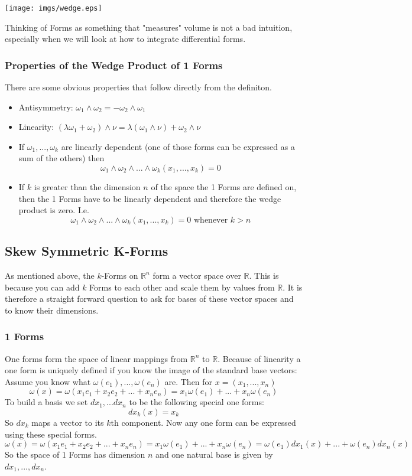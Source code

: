\texttt{[image: imgs/wedge.eps]}

Thinking of Forms as something that "measures" volume is not a bad intuition, especially when we will look at how to integrate differential forms.

\subsubsection*{\textbf{Properties of the Wedge Product of 1 Forms}}

There are some obvious properties that follow directly from the definiton.
\begin{itemize}
\item Antisymmetry: $\omega_1 \wedge \omega_2 = -\omega_2 \wedge \omega_1$
\item Linearity: $(\lambda \omega_1 + \omega_2) \wedge \nu = \lambda (\omega_1 \wedge \nu) + \omega_2 \wedge \nu  $
\item If $\omega_1,...,\omega_k$ are linearly dependent (one of those forms can be expressed as a sum of the others) then
\[\omega_1 \wedge \omega_2\wedge...\wedge \omega_k (x_1,...,x_k) =0\]
\item If $k$ is greater than the dimension $n$ of the space the 1 Forms are defined on, then the 1 Forms have to be linearly dependent and therefore the wedge product is zero. I.e.
\[\omega_1 \wedge \omega_2\wedge...\wedge \omega_k (x_1,...,x_k) =0 \text{ whenever } k>n\]
\end{itemize}
\subsection{Skew Symmetric K-Forms}
As mentioned above, the $k$-Forms on $\mathbb R^n$ form a vector space over $\mathbb R$. This is because you can add $k$ Forms to each other and scale them by values from $\mathbb R$.
It is therefore a straight forward question to ask for bases of these vector spaces and to know their dimensions.
\subsubsection*{\textbf{1 Forms}}
One forms form the space of linear mappings from $\mathbb R^n$ to $\mathbb R$. Because of linearity a one form is uniquely defined if you know the image of the standard base vectors: Assume you know what $\omega(e_1),...,\omega(e_n)$ are. Then for $x=(x_1,...,x_n)$ 
\[\omega(x) = \omega(x_1e_1 + x_2e_2+...+x_ne_n) = x_1\omega(e_1) + ... + x_n\omega(e_n)\]
To build a basis we set $dx_1,...dx_n$ to be the following special one forms:
\[dx_k(x) = x_k\]
So $dx_k$ maps a vector to its $k$th component. Now any one form can be expressed using these special forms.
\[\omega(x) = \omega(x_1e_1 + x_2e_2+...+x_ne_n) = x_1\omega(e_1) + ... + x_n\omega(e_n) = \omega(e_1)dx_1(x) + ... + \omega(e_n)dx_n(x)\]
So the space of 1 Forms has dimension $n$ and one natural base is given by $dx_1,...,dx_n$.

